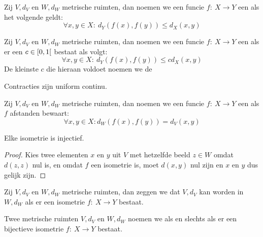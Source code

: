 \documentclass[main.tex]{subfiles}
\begin{document}
\begin{de}
  Zij $V,d_{V}$ en $W,d_{W}$ metrische ruimten, dan noemen we een funcie $f:\ X \rightarrow Y$ een  als het volgende geldt:
  \[ \forall x,y\in X:\ d_{Y}(f(x),f(y)) \le d_{X}(x,y) \]
\end{de}

\begin{de}
  Zij $V,d_{V}$ en $W,d_{W}$ metrische ruimten, dan noemen we een funcie $f:\ X \rightarrow Y$ een  als er een $c\in \interval[open right]{0}{1}$ bestaat als volgt:
  \[ \forall x,y\in X:\ d_{Y}(f(x),f(y)) \le c d_{X}(x,y) \]
  De kleinste $c$ die hieraan voldoet noemen we de 
\end{de}

\begin{st}
  Contracties zijn uniform continu.
\end{st}

\begin{de}
  Zij $V,d_{V}$ en $W,d_{W}$ metrische ruimten, dan noemen we een funcie $f:\ X \rightarrow Y$ een  als $f$ afstanden bewaart:
  \[ \forall x,y \in X: d_{W}(f(x),f(y)) = d_{V}(x,y) \]
\end{de}

\begin{st}
  Elke isometrie is injectief.

  \begin{proof}
    Kies twee elementen $x$ en $y$ uit $V$ met hetzelfde beeld $z\in W$ omdat $d(z,z)$ nul is, en omdat $f$ een isometrie is, moet $d(x,y)$ nul zijn en $x$ en $y$ dus gelijk zijn.
  \end{proof}
\end{st}

\begin{de}
  Zij $V,d_{V}$ en $W,d_{W}$ metrische ruimten, dan zeggen we dat $V,d_{V}$  kan worden in $W,d_{W}$ als er een isometrie $f:\ X \rightarrow Y$ bestaat.
\end{de}

\begin{de}
  Twee metrische ruimten $V,d_{V}$ en $W,d_{W}$ noemen we  als en slechts als er een bijectieve isometrie $f:\ X \rightarrow Y$ bestaat.
\end{de}


\end{document}
